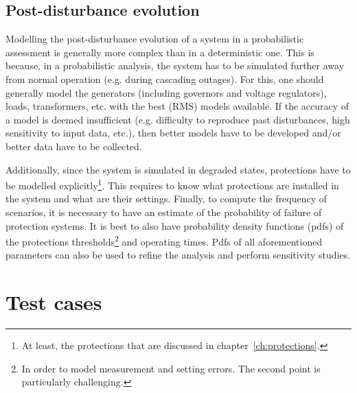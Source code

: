 \subsection{Post-disturbance evolution}

Modelling the post-disturbance evolution of a system in a probabilistic assessment is generally more complex than in a deterministic one. This is because, in a probabilistic analysis, the system has to be simulated further away from normal operation (e.g. during cascading outages). For this, one should generally model the generators (including governors and voltage regulators), loads, transformers, etc. with the best (RMS) models available. If the accuracy of a model is deemed insufficient (e.g. difficulty to reproduce past disturbances, high sensitivity to input data, etc.), then better models have to be developed and/or better data have to be collected.

Additionally, since the system is simulated in degraded states, protections have to be modelled explicitly\footnote{At least, the protections that are discussed in chapter~\ref{ch:protections}.}. This requires to know what protections are installed in the system and what are their settings. Finally, to compute the frequency of scenarios, it is necessary to have an estimate of the probability of failure of protection systems. It is best to also have probability density functions (pdfs) of the protections thresholds\footnote{In order to model measurement and setting errors. The second point is particularly challenging.} and operating times. Pdfs of all aforementioned parameters can also be used to refine the analysis and perform sensitivity studies.


\section{Test cases}
\label{sec:testCases}

